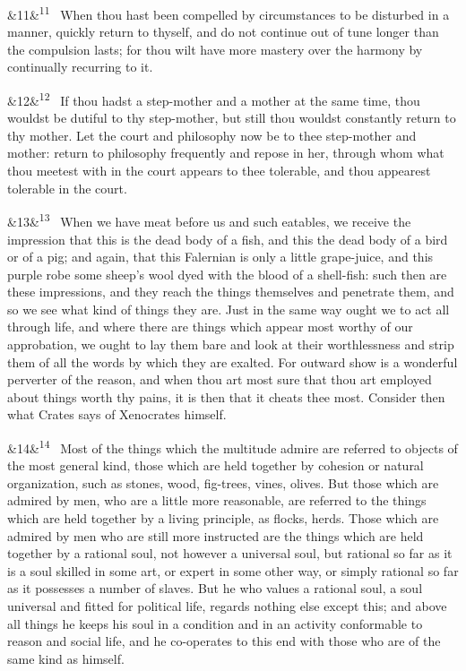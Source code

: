 \documentclass[12pt]{article}
\newcommand{\para}[1][]{\par\noindent\ifx&#1&\else\textsuperscript{\footnotesize #1}~\fi}
\begin{document}
\para[11] When thou hast been compelled by circumstances to be disturbed in a
manner, quickly return to thyself, and do not continue out of tune
longer than the compulsion lasts; for thou wilt have more mastery over
the harmony by continually recurring to it.

\para[12] If thou hadst a step-mother and a mother at the same time, thou
wouldst be dutiful to thy step-mother, but still thou wouldst constantly
return to thy mother. Let the court and philosophy now be to thee
step-mother and mother: return to philosophy frequently and repose in
her, through whom what thou meetest with in the court appears to thee
tolerable, and thou appearest tolerable in the court.

\para[13] When we have meat before us and such eatables, we receive the
impression that this is the dead body of a fish, and this the dead body
of a bird or of a pig; and again, that this Falernian is only a little
grape-juice, and this purple robe some sheep's wool dyed with the blood
of a shell-fish: such then are these impressions, and they reach the
things themselves and penetrate them, and so we see what kind of things
they are. Just in the same way ought we to act all through life, and
where there are things which appear most worthy of our approbation, we
ought to lay them bare and look at their worthlessness and strip them of
all the words by which they are exalted. For outward show is a wonderful
perverter of the reason, and when thou art most sure that thou art
employed about things worth thy pains, it is then that it cheats thee
most. Consider then what Crates says of Xenocrates himself.

\para[14] Most of the things which the multitude admire are referred to
objects of the most general kind, those which are held together by
cohesion or natural organization, such as stones, wood, fig-trees,
vines, olives. But those which are admired by men, who are a little more
reasonable, are referred to the things which are held together by a
living principle, as flocks, herds. Those which are admired by men who
are still more instructed are the things which are held together by a
rational soul, not however a universal soul, but rational so far as it
is a soul skilled in some art, or expert in some other way, or simply
rational so far as it possesses a number of slaves. But he who values a
rational soul, a soul universal and fitted for political life, regards
nothing else except this; and above all things he keeps his soul in a
condition and in an activity conformable to reason and social life, and
he co-operates to this end with those who are of the same kind as
himself.
\end{document}
